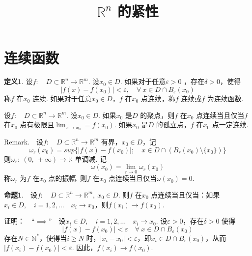 \documentclass{article}
\title{\(\mathbb{R}^n\) 的紧性}
\author{}
\date{}
\begin{document}
\maketitle

\section{连续函数}
\textbf{定义1}. 设\(f:\quad D \subset \mathbb{R}^n \to \mathbb{R}^{m}\). 设\(x_0 \in D\). 如果对于任意\(\varepsilon > 0\) ，存在\(\delta > 0\)，使得
\begin{equation*}
    | f(x) - f(x_0) |< \varepsilon ,\quad \forall\ x \in D \cap B_{\varepsilon }(x_0)
\end{equation*}
称\(f\) 在\(x_0\) 连续. 如果对于任意\(x_0 \in D\)，\(f\) 在\(x_0\) 点连续，称\(f\) 连续或\(f\) 为连续函数.

\vspace{10pt}

设\(f:\quad D \subset \mathbb{R}^n \to \mathbb{R}^{m}\). 设\(x_0 \in D\). 如果\(x_0\) 是\(D\) 的聚点，则\(f\) 在\(x_0\) 点连续当且仅当\(f\) 在\(x_0\) 点有极限且\(\lim_{x \to x_0} = f(x_0)  \). 如果\(x_0\) 是\(D\) 的孤立点，\(f\) 在\(x_0\) 点一定连续.

\vspace{20pt}

Remark.\ \ 设\(f:\quad D \subset \mathbb{R}^n \to \mathbb{R}^{m}\) 有界，\(x_0 \in D\)，记
\begin{equation*}
    \omega _{r}(x_0) = sup \{| f(x) - f(x_0)|;\quad x \in D \cap \left( B_r(x_0)\setminus \{x_0\}  \right)  \}
\end{equation*}
则\(\omega _{r}:\ (0,\ + \infty )\to \mathbb{R}\) 单调减. 记
\begin{equation*}
    \omega (x_0) = \lim_{r \to 0}\omega _{r}(x_0)
\end{equation*}
称\(\omega _{r}\) 为\(f\) 在\(x_0\) 点的振幅. 则\(f\) 在\(x_0\) 点连续当且仅当\(\omega (x_0) = 0\).

\newpage

\textbf{命题1}.\ \ 设\(f:\quad D \subset \mathbb{R}^n \to \mathbb{R}^{m},\ x_0 \in D\). 则\(f\) 在\(x_0\) 点连续当且仅当：如果\(x_i \in D,\quad i = 1,2,\dots \quad  x_i \to x_0\)，则\(f(x_i)\to f(x_0) \).

\vspace{10pt}

证明：\ \ “\( \implies \)”\ \ 设\(x_i \in D,\quad i = 1,2,\dots \quad x_i \to x_0\). 设\(\varepsilon > 0\)，存在\(\delta > 0\) 使得
\begin{equation*}
    | f(x) - f(x_0) |< \varepsilon \quad \forall\ x \in D \cap B_{\varepsilon }(x_0)
\end{equation*}
存在\(N \in \mathbb{N}^{*}\)，使得当\(i \ge N\) 时，\(| x_i - x_0 |< \varepsilon  \)，即\(x_i \in D \cap B_{\varepsilon }(x_0)\)，从而\(|f(x_i) - f(x_0)|< \varepsilon \). 因此，\(f(x_i)\to f(x_0)\).
\end{document}
